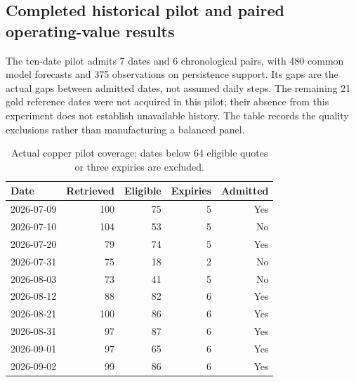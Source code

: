 \subsection{Completed historical pilot and paired operating-value results}
\label{sec:copper-completed-results}
The ten-date pilot admits 7 dates and 6 chronological pairs, with 480 common model forecasts and 375 observations on persistence support. Its gaps are the actual gaps between admitted dates, not assumed daily steps. The remaining 21 gold reference dates were not acquired in this pilot; their absence from this experiment does not establish unavailable history. The table records the quality exclusions rather than manufacturing a balanced panel.

\begin{table}[H]
\centering
\small
\caption{Actual copper pilot coverage; dates below 64 eligible quotes or three expiries are excluded.}
\label{tab:copper-temporal-coverage}
\begin{tabularx}{\textwidth}{@{}Xrrrr@{}}
\toprule
Date & Retrieved & Eligible & Expiries & Admitted \\
\midrule
2026-07-09 & 100 & 75 & 5 & Yes \\
2026-07-10 & 104 & 53 & 5 & No \\
2026-07-20 & 79 & 74 & 5 & Yes \\
2026-07-31 & 75 & 18 & 2 & No \\
2026-08-03 & 73 & 41 & 5 & No \\
2026-08-12 & 88 & 82 & 6 & Yes \\
2026-08-21 & 100 & 86 & 6 & Yes \\
2026-08-31 & 97 & 87 & 6 & Yes \\
2026-09-01 & 97 & 65 & 6 & Yes \\
2026-09-02 & 99 & 86 & 6 & Yes \\
\bottomrule
\end{tabularx}
\end{table}


